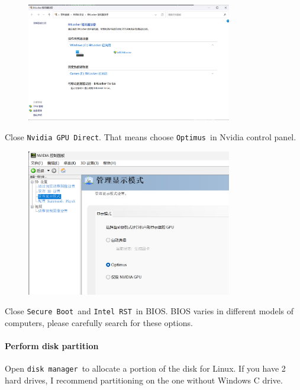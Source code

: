 \documentclass[12pt]{ctexart}
\begin{document}
\begin{figure}[H]
    \centering
    \includegraphics[width=0.8\textwidth,keepaspectratio]{assets/Linux/3.1 Seek common ground while reserving differences/6.png}
\end{figure}

Close \texttt{Nvidia\ GPU\ Direct}. That means choose \texttt{Optimus}\
in Nvidia control panel.

\begin{figure}[H]
    \centering
    \includegraphics[width=0.8\textwidth,keepaspectratio]{assets/Linux/3.1 Seek common ground while reserving differences/7.png}
\end{figure}

Close \texttt{Secure\ Boot}\ and \texttt{Intel\ RST}\ in BIOS. BIOS varies
in different models of computers, please carefully search for these
options.

\paragraph{\textbf{Perform disk partition}}\par
\vspace{1em}
Open \texttt{disk\ manager}\ to allocate a portion of the disk for Linux.
If you have 2 hard drives, I recommend partitioning on the one without
Windows C drive.
\end{document}
